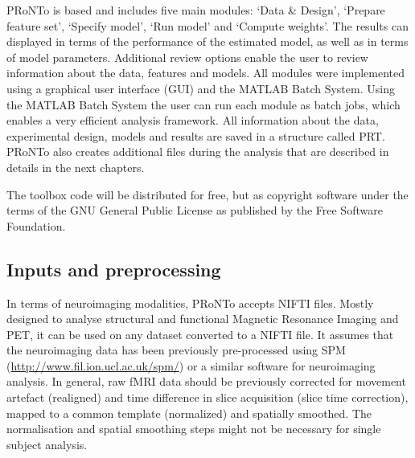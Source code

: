 PRoNTo is \matlab based and includes five main modules: `Data \& Design', `Prepare feature set', `Specify model', `Run model' and `Compute weights'. The results can displayed in terms of the performance of the estimated model, as well as in terms of model parameters. Additional review options enable the user to review information about the data, features and models. All modules were implemented using a graphical user interface (GUI) and the MATLAB Batch System. Using the MATLAB Batch System the user can run each module as batch jobs, which enables a very efficient analysis framework.  All information about the data, experimental design, models and results are saved in a structure called PRT. PRoNTo also creates additional files during the analysis that are described in details in the next chapters.

The toolbox code will be distributed for free, but as copyright software under the terms of the GNU General Public License as published by the Free Software Foundation. 

\subsection{Inputs and preprocessing}

In terms of neuroimaging modalities, PRoNTo accepts NIFTI files. Mostly designed to analyse structural and functional Magnetic Resonance Imaging and PET, it can be used on any dataset converted to a NIFTI file. It assumes that the neuroimaging data has been previously pre-processed using SPM (\url{http://www.fil.ion.ucl.ac.uk/spm/}) or a similar software for neuroimaging analysis. In general, raw fMRI data should be previously corrected for movement artefact (realigned) and time difference in slice acquisition (slice time correction), mapped to a common template (normalized) and spatially smoothed. The normalisation and spatial smoothing steps might not be necessary for single subject analysis.  

